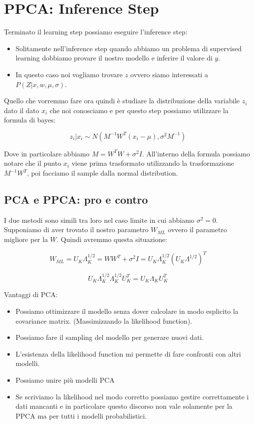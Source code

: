 \documentclass[14pt]{extreport}
\begin{document}
\section{PPCA: Inference Step}

Terminato il learning step possiamo eseguire l'inference step:
\begin{itemize}
	\item Solitamente nell'inference step quando abbiamo un problema di supervised learning dobbiamo provare il nostro modello e inferire 
	il valore di $y$.
	\item In questo caso noi vogliamo trovare $z$ ovvero siamo interessati a $P(Z|x, w, \mu, \sigma)$.
\end{itemize}

Quello che vorremmo fare ora quindi è studiare la distribuzione della variabile $z_i$ dato il dato $x_i$ che noi conosciamo e per questo step possiamo utilizzare
la formula di bayes:

$$z_i | x_i \sim N(M^{-1}W^{T}(x_i-\mu), \sigma^2M^{-1})$$

Dove in particolare abbiamo $M = W^TW + \sigma^2I$. All'interno della formula possiamo notare che il punto $x_i$ viene prima trasformato utilizzando la trasformazione
$M^{-1}W^{T}$, poi facciamo il sample dalla normal distribution.

\subsection{PCA e PPCA: pro e contro}

I due metodi sono simili tra loro nel caso limite in cui abbiamo $\sigma^2 = 0$.
Supponiamo di aver trovato il nostro parametro $W_{ML}$ ovvero il parametro migliore per la $W$. 
Quindi avremmo questa situazione:

$$W_{ML} = U_K\Lambda_K^{1/2} = WW^T + \sigma^2I = U_K\Lambda_K^{1/2}(U_K\Lambda^{1/2})^T$$

$$U_K\Lambda_K^{1/2}\Lambda_K^{1/2}U_{K}^{T} = U_K \Lambda_K U_K^T$$

Vantaggi di PCA:

\begin{itemize}
	\item Possiamo ottimizzare il modello senza dover calcolare in modo esplicito la covariance matrix. (Massimizzando la likelihood function).
	\item Possiamo fare il sampling del modello per generare nuovi dati.
	\item L'esistenza della likelihood function mi permette di fare confronti con altri modelli.
	\item Possiamo unire più modelli PCA
	\item Se scriviamo la likelihood nel modo corretto possiamo gestire correttamente i dati mancanti e in particolare questo discorso non vale solamente per la PPCA
	ma per tutti i modelli probabilistici.
\end{itemize}
\end{document}

